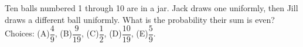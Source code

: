 Ten balls numbered 1 through 10 are in a jar. Jack draws one uniformly, then Jill draws a different ball uniformly. What is the probability their sum is even? Choices: (A)$\dfrac{4}{9}$, (B)$\dfrac{9}{19}$, (C)$\dfrac{1}{2}$, (D)$\dfrac{10}{19}$, (E)$\dfrac{5}{9}$.
